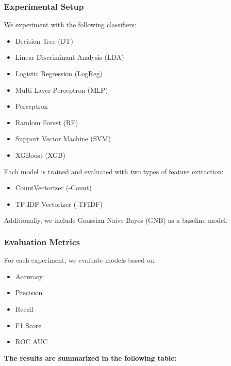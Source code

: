 \subsubsection{Experimental Setup}

We experiment with the following classifiers:
\begin{itemize}
    \item Decision Tree (DT)
    \item Linear Discriminant Analysis (LDA)
    \item Logistic Regression (LogReg)
    \item Multi-Layer Perceptron (MLP)
    \item Perceptron
    \item Random Forest (RF)
    \item Support Vector Machine (SVM)
    \item XGBoost (XGB)
\end{itemize}

Each model is trained and evaluated with two types of feature extraction:
\begin{itemize}
    \item CountVectorizer (-Count)
    \item TF-IDF Vectorizer (-TFIDF)
\end{itemize}

Additionally, we include Gaussian Naive Bayes (GNB) as a baseline model.

\subsubsection{Evaluation Metrics}

For each experiment, we evaluate models based on:
\begin{itemize}
    \item Accuracy
    \item Precision
    \item Recall
    \item F1 Score
    \item ROC AUC
\end{itemize}

\textbf{The results are summarized in the following table:}

